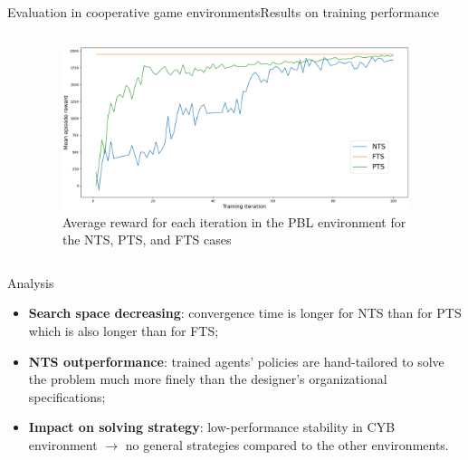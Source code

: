 \begin{frame}[allowframebreaks]{Evaluation in cooperative game environments}{Results on training performance}

    \begin{columns}

        \begin{column}{0.3\textwidth}
            { \tiny
                }

        \end{column}

        \hspace{1ex}

        \begin{column}{0.7\textwidth}
            \begin{figure}[h!]
                \centering
                \includegraphics[width=0.95\textwidth]{figures/prahom_learning_curve.png}
                \caption{Average reward for each iteration in the PBL environment for the NTS, PTS, and FTS cases}
                \label{fig:prahom_learning_curve}
            \end{figure}
        \end{column}

    \end{columns}

    \begin{block}{Analysis}

        \begin{itemize}
            \item \textbf{Search space decreasing}: convergence time is longer for NTS than for PTS which is also longer than for FTS;
            \item \textbf{NTS outperformance}: trained agents' policies are hand-tailored to solve the problem much more finely than the designer's organizational specifications;
            \item \textbf{Impact on solving strategy}: low-performance stability in CYB environment $\rightarrow$ no general strategies compared to the other environments.
        \end{itemize}

    \end{block}

\end{frame}

